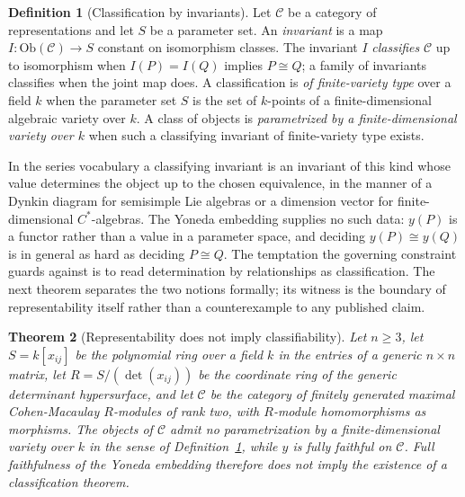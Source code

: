 \documentclass[11pt,letterpaper]{article}
\newtheorem{theorem}{Theorem}[section]
\theoremstyle{definition}
\newtheorem{definition}[theorem]{Definition}
\theoremstyle{remark}
\begin{document}
\begin{definition}[Classification by invariants]
\label{def:classify}
Let $\mathcal{C}$ be a category of representations and let $S$ be a parameter set. An \emph{invariant} is a map $I \colon \mathrm{Ob}(\mathcal{C}) \to S$ constant on isomorphism classes. The invariant $I$ \emph{classifies} $\mathcal{C}$ up to isomorphism when $I(P) = I(Q)$ implies $P \cong Q$; a family of invariants classifies when the joint map does. A classification is \emph{of finite-variety type} over a field $k$ when the parameter set $S$ is the set of $k$-points of a finite-dimensional algebraic variety over $k$. A class of objects is \emph{parametrized by a finite-dimensional variety over $k$} when such a classifying invariant of finite-variety type exists.
\end{definition}

In the series vocabulary a classifying invariant is an invariant of this kind whose value determines the object up to the chosen equivalence, in the manner of a Dynkin diagram for semisimple Lie algebras or a dimension vector for finite-dimensional $C^*$-algebras. The Yoneda embedding supplies no such data: $y(P)$ is a functor rather than a value in a parameter space, and deciding $y(P) \cong y(Q)$ is in general as hard as deciding $P \cong Q$. The temptation the governing constraint guards against is to read determination by relationships as classification. The next theorem separates the two notions formally; its witness is the boundary of representability itself rather than a counterexample to any published claim.

\begin{theorem}[Representability does not imply classifiability]
\label{thm:noimplication}
Let $n \geq 3$, let $S = k[x_{ij}]$ be the polynomial ring over a field $k$ in the entries of a generic $n \times n$ matrix, let $R = S/(\det(x_{ij}))$ be the coordinate ring of the generic determinant hypersurface, and let $\mathcal{C}$ be the category of finitely generated maximal Cohen-Macaulay $R$-modules of rank two, with $R$-module homomorphisms as morphisms. The objects of $\mathcal{C}$ admit no parametrization by a finite-dimensional variety over $k$ in the sense of Definition~\ref{def:classify}, while $y$ is fully faithful on $\mathcal{C}$. Full faithfulness of the Yoneda embedding therefore does not imply the existence of a classification theorem.
\end{theorem}
\end{document}
